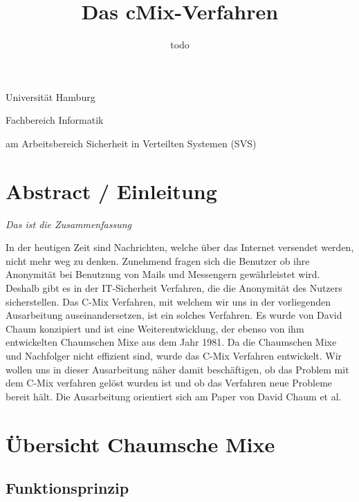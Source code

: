 \documentclass[
    fontsize=12pt,
    headings=small,
    parskip=half,           %
    bibliography=totoc,
    numbers=noenddot,       %
    open=any,               %
    ]{scrreprt}
\title{Das cMix-Verfahren}
\author{todo}
\begin{document}
\begin{titlepage}
\begin{center}\Large
    Universität Hamburg \par
    Fachbereich Informatik
    \vfill
    \makeatletter
    {\Large\textsf{\textbf{\@title}}\par}
    \makeatother
    \bigskip
    am Arbeitsbereich Sicherheit in Verteilten Systemen (SVS) \par
    \bigskip
    \makeatletter
    {\@author} \par
    \makeatother
    \bigskip
    \makeatletter
    {\@date}
    \makeatother
    \vfill

\end{center}
\end{titlepage}

\tableofcontents

\chapter{Abstract / Einleitung}
\textit{Das ist die Zusammenfassung}

In der heutigen Zeit sind Nachrichten, welche über das Internet versendet werden, nicht
mehr weg zu denken. Zunehmend fragen sich die Benutzer ob ihre Anonymität bei
Benutzung von Mails und Messengern gewährleistet wird. Deshalb gibt es in der IT-Sicherheit Verfahren, die die Anonymität des Nutzers sicherstellen. Das C-Mix Verfahren, mit welchem wir uns in der
vorliegenden Ausarbeitung auseinandersetzen, ist ein solches Verfahren. Es
wurde von David Chaum konzipiert und ist eine
Weiterentwicklung, der ebenso von ihm entwickelten Chaumschen Mixe aus dem Jahr
1981. Da die Chaumschen Mixe und Nachfolger nicht effizient sind,
wurde das C-Mix Verfahren entwickelt.
Wir wollen uns in dieser Ausarbeitung
näher damit beschäftigen, ob das Problem mit dem C-Mix verfahren gelöst wurden ist
und ob das Verfahren neue Probleme bereit hält.
Die Ausarbeitung orientiert sich am Paper \cite{DBLP:journals/iacr/DavidChaumJKKRS16} von David Chaum et al.


\chapter{Übersicht Chaumsche Mixe}

\section{Funktionsprinzip}
\end{document}
